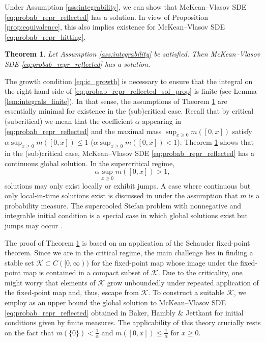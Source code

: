 \documentclass[11pt, a4paper]{article}
\theoremstyle{plain}
\newtheorem{theorem}{Theorem}[section]
\theoremstyle{definition}
\theoremstyle{remark}
\numberwithin{equation}{section}
\renewcommand{\cal}[1]{\mathcal{#1}}
\begin{document}
Under Assumption \ref{ass:integrability}, we can show that McKean--Vlasov SDE \eqref{eq:probab_repr_reflected} has a solution. %
In view of Proposition \ref{prop:equivalence}, this also implies existence for McKean--Vlasov SDE \eqref{eq:probab_repr_hitting}.

\begin{theorem} \label{thm:repr_reflected_exist}
Let Assumption \ref{ass:integrability} be satisfied. Then McKean--Vlasov SDE \eqref{eq:probab_repr_reflected} has a solution.
\end{theorem}

The growth condition \eqref{eq:ic_growth} is necessary to ensure that the integral on the right-hand side of \eqref{eq:probab_repr_reflected_sol_prop} is finite (see Lemma \ref{lem:integrals_finite}). In that sense, the assumptions of Theorem \ref{thm:repr_reflected_exist} are essentially minimal for existence in the (sub)critical case. Recall that by critical (subcritical) we mean that the coefficient $\alpha$ appearing in \eqref{eq:probab_repr_reflected} and the maximal mass $\sup_{x \geq 0} m([0, x])$ satisfy $\alpha \sup_{x \geq 0} m([0, x]) \leq 1$ ($\alpha \sup_{x \geq 0} m([0, x]) < 1$). Theorem \ref{thm:repr_reflected_exist} shows that in the (sub)critical case, McKean--Vlasov SDE \eqref{eq:probab_repr_reflected} has a continuous global solution. In the supercritical regime,
\begin{equation*}
    \alpha \sup_{x \geq 0} m([0, x]) > 1,
\end{equation*}
solutions may only exist locally or exhibit jumps. A case where continuous but only local-in-time solutions exist is discussed in \cite[Theorem 1.12]{baker_loc_times_2025} under the assumption that $m$ is a probability measure. The supercooled Stefan problem with nonnegative and integrable initial condition is a special case in which global solutions exist but jumps may occur \cite{hambly_mckean_2019, nadtochiy_mean_field_2020, delarue_stefan_2022}.

The proof of Theorem \ref{thm:repr_reflected_exist} is based on an application of the Schauder fixed-point theorem. Since we are in the critical regime, the main challenge lies in finding a stable set $\cal{K} \subset C([0, \infty))$ for the fixed-point map whose image under the fixed-point map is contained in a compact subset of $\cal{K}$. Due to the criticality, one might worry that elements of $\cal{K}$ grow unboundedly under repeated application of the fixed-point map and, thus, escape from $\cal{K}$. To construct a suitable $\cal{K}$, we employ as an upper bound the global solution to McKean--Vlasov SDE \eqref{eq:probab_repr_reflected} obtained in Baker, Hambly \& Jettkant \cite{baker_loc_times_2025} for initial conditions given by finite measures. The applicability of this theory crucially rests on the fact that $m(\{0\}) < \frac{1}{\alpha}$ and $m([0, x]) \leq \frac{1}{\alpha}$ for $x \geq 0$.
\end{document}
